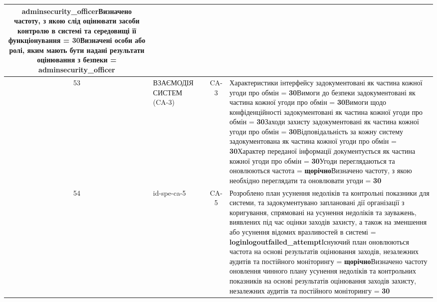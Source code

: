 \documentclass[10pt]{article}
\begin{document}
\begin{longtable}{|c|>{\raggedright\arraybackslash}p{2.5cm}|>{\raggedright\arraybackslash}p{4.5cm}|c|>{\raggedright\arraybackslash}p{4.5cm}|}
\textbf{adminsecurity\_\allowbreak{}officer}\newline Визначено частоту, з якою слід оцінювати засоби контролю в системі та середовищі її функціонування = \textbf{30}\newline Визначені особи або ролі, яким мають бути надані результати оцінювання з безпеки = \textbf{adminsecurity\_\allowbreak{}officer} \\ \hline
53 & ВЗАЄМОДІЯ СИСТЕМ (CA-3) &  & CA-3 & Характеристики інтерфейсу задокументовані як частина кожної угоди про обмін = \textbf{30}\newline Вимоги до безпеки задокументовані як частина кожної угоди про обмін = \textbf{30}\newline Вимоги щодо конфіденційності задокументовані як частина кожної угоди про обмін = \textbf{30}\newline Заходи захисту задокументовані як частина кожної угоди про обмін = \textbf{30}\newline Відповідальність за кожну систему задокументована як частина кожної угоди про обмін = \textbf{30}\newline Характер переданої інформації документується як частина кожної угоди про обмін = \textbf{30}\newline Угоди переглядаються та оновлюються частота = \textbf{щорічно}\newline Визначено частоту, з якою необхідно переглядати та оновлювати угоди = \textbf{30} \\ \hline
54 & id-spe-ca-5 &  & CA-5 & Розроблено план усунення недоліків та контрольні показники для системи, та задокументувано заплановані дії організації з коригування, спрямовані на усунення недоліків та зауважень, виявлених під час оцінки заходів захисту, а також на зменшення або усунення відомих вразливостей в системі = \textbf{loginlogoutfailed\_\allowbreak{}attempt}\newline Існуючий план оновлюються частота на основі результатів оцінювання заходів, незалежних аудитів та постійного моніторингу = \textbf{щорічно}\newline Визначено частоту оновлення чинного плану усунення недоліків та контрольних показників на основі результатів оцінювання заходів захисту, незалежних аудитів та постійного моніторингу = \textbf{30} \\ \hline

\end{longtable}
\end{document}
